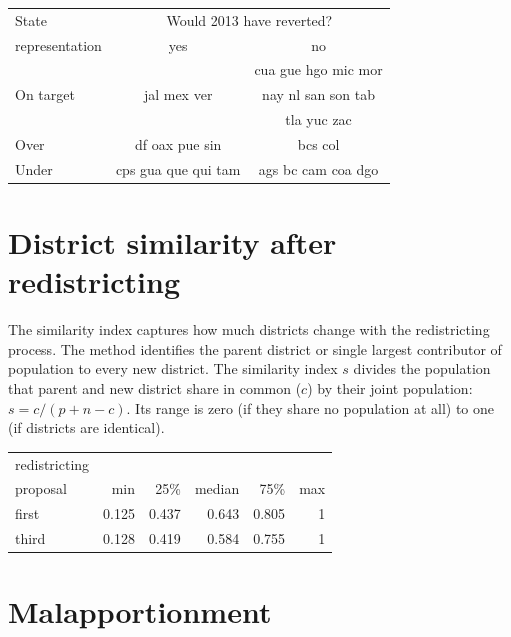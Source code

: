 \documentclass[letter,12pt]{article}
\newcommand{\mc}{\multicolumn}
\begin{document}
\begin{tabular}{l|c|c|}
State          & \mc{2}{c}{Would 2013 have reverted?}\\ \cline{2-3}
representation & yes                  & no \\ \hline
               &                      & cua gue hgo mic mor  \\ 
On target      & jal mex ver          & nay nl san son tab  \\ 
               &                      & tla yuc zac \\ \hline
Over           & df oax pue sin       & bcs col\\ \hline
Under          &  cps gua que qui tam & ags bc cam coa dgo\\ \hline
\end{tabular}


\section{District similarity after redistricting}

The similarity index \citep[][:15--7]{cox.katz.2002} captures how much districts change with the redistricting process. The method identifies the parent district or single largest contributor of population to every new district. The similarity index $s$ divides the population that parent and new district share in common ($c$) by their joint population: $s = c / (p + n - c)$. Its range is zero (if they share no population at all) to one (if districts are identical). 

\begin{tabular}{lrrrrr}
redistricting &        &        &        &       &      \\
proposal      &   min  &  25\%  & median &  75\% &  max \\ \hline
first         & 0.125  & 0.437  & 0.643  & 0.805 &  1   \\
third         & 0.128  & 0.419  & 0.584  & 0.755 &  1   \\
\end{tabular}


\section{Malapportionment}
\end{document}

